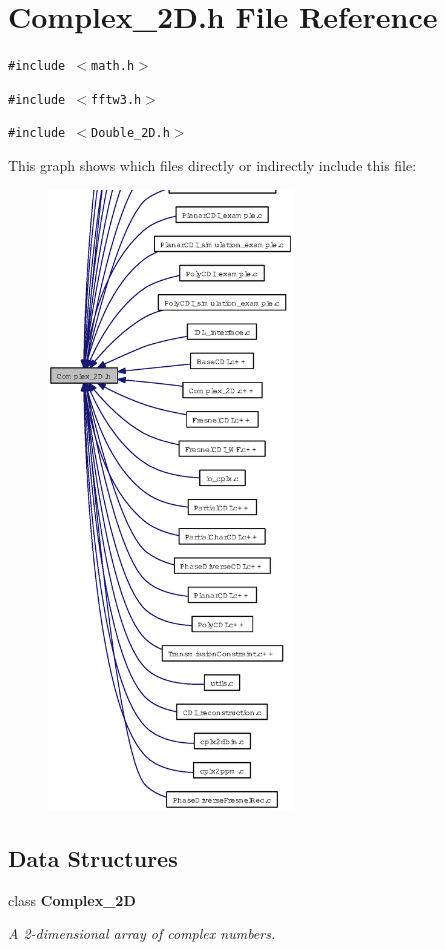 \section{Complex\_\-2D.h File Reference}
\label{Complex__2D_8h}
{\tt \#include $<$math.h$>$}\par
{\tt \#include $<$fftw3.h$>$}\par
{\tt \#include $<$Double\_\-2D.h$>$}\par


This graph shows which files directly or indirectly include this file:\begin{figure}[H]
\begin{center}
\leavevmode
\includegraphics[width=184pt]{Complex__2D_8h__dep__incl}
\end{center}
\end{figure}
\subsection*{Data Structures}
\begin{CompactItemize}
\item 
class \bf{Complex\_\-2D}
\begin{CompactList}\small\item\em A 2-dimensional array of complex numbers. \item\end{CompactList}\end{CompactItemize}
